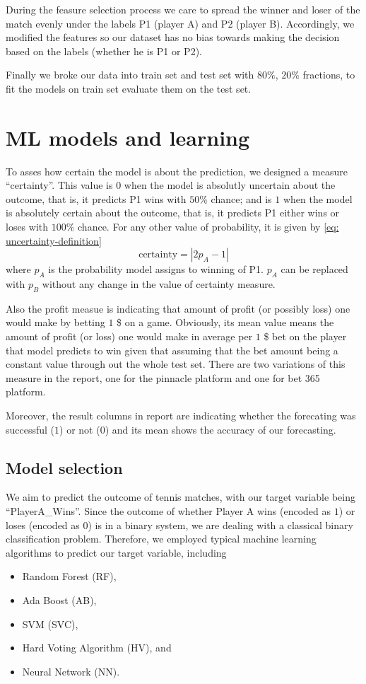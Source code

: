 \documentclass[preprint,aps,nofootinbib,a4paper,superscriptaddress,longbibliography,amsfonts,amssymb,amsmath,titlepage]{revtex4-2}
\begin{document}
During the feasure selection process we care to spread the winner and loser of the match evenly under the labels P1 (player A) and P2 (player B). Accordingly, we modified the features so our dataset has no bias towards making the decision based on the labels (whether he is P1 or P2).

Finally we broke our data into train set and test set with $80\%$, $20\%$ fractions, to fit the models on train set evaluate them on the test set.

\section{ML models and learning}

To asses how certain the model is about the prediction, we designed a measure ``certainty''. This value is $0$ when the model is absolutly uncertain about the outcome, that is, it predicts P1 wins with $50\%$ chance; and is $1$ when the model is absolutely certain about the outcome, that is, it predicts P1 either wins or loses with $100\%$ chance. For any other value of probability, it is given by \eqref{eq: uncertainty-definition} 
%
\begin{equation}\label{eq: uncertainty-definition}
\textrm{certainty} = | 2 p_A - 1 |
\end{equation}
%
where $p_A$ is the probability model assigns to winning of P1. $p_A$ can be replaced with $p_B$ without any change in the value of certainty measure.

Also the profit measue is indicating that amount of profit (or possibly loss) one would make by betting $1$ \$ on a game. Obviously, its mean value means the amount of profit (or loss) one would make in average per $1$ \$ bet on the player that model predicts to win given that assuming that the bet amount being a constant value through out the whole test set. There are two variations of this measure in the report, one for the pinnacle platform and one for bet 365 platform.

Moreover, the result columns in report are indicating whether the forecating was successful ($1$) or not ($0$) and its mean shows the accuracy of our forecasting.

\subsection{Model selection}

We aim to predict the outcome of tennis matches, with our target variable being ``PlayerA\_Wins''. Since the outcome of whether Player A wins (encoded as $1$) or loses (encoded as $0$) is in a binary system, we are dealing with a classical binary classification problem. Therefore, we employed typical machine learning algorithms to predict our target variable, including
%
\begin{itemize}
\item Random Forest (RF),
\item Ada Boost (AB),
\item SVM (SVC),
\item Hard Voting Algorithm (HV), and
\item Neural Network (NN).
\end{itemize}
\end{document}
